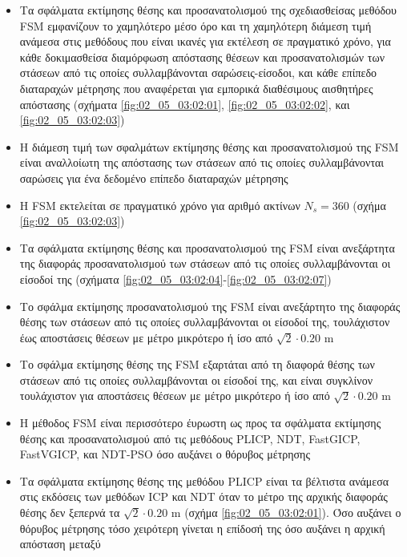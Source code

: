\begin{itemize}
  \item Τα σφάλματα εκτίμησης θέσης και προσανατολισμού της σχεδιασθείσας
        μεθόδου FSM εμφανίζουν το χαμηλότερο μέσο όρο και τη χαμηλότερη
        διάμεση τιμή ανάμεσα στις μεθόδους που είναι ικανές για εκτέλεση σε
        πραγματικό χρόνο, για κάθε δοκιμασθείσα διαμόρφωση απόστασης θέσεων και
        προσανατολισμών των στάσεων από τις οποίες συλλαμβάνονται
        σαρώσεις-είσοδοι, και κάθε επίπεδο διαταραχών μέτρησης που αναφέρεται
        για εμπορικά διαθέσιμους αισθητήρες απόστασης (σχήματα
        \ref{fig:02_05_03:02:01}, \ref{fig:02_05_03:02:02}, και
        \ref{fig:02_05_03:02:03})
  \item Η διάμεση τιμή των σφαλμάτων εκτίμησης θέσης και προσανατολισμού
        της FSM είναι αναλλοίωτη της απόστασης των στάσεων από τις οποίες
        συλλαμβάνονται σαρώσεις για ένα δεδομένο επίπεδο διαταραχών μέτρησης
  \item Η FSM εκτελείται σε πραγματικό χρόνο για αριθμό ακτίνων $N_s = 360$
        (σχήμα \ref{fig:02_05_03:02:03})
  \item Τα σφάλματα εκτίμησης θέσης και προσανατολισμού της FSM είναι
        ανεξάρτητα της διαφοράς προσανατολισμού των στάσεων από τις οποίες
        συλλαμβάνονται οι είσοδοί της (σχήματα
        \ref{fig:02_05_03:02:04}-\ref{fig:02_05_03:02:07})
  \item Το σφάλμα εκτίμησης προσανατολισμού της FSM είναι ανεξάρτητο της
        διαφοράς θέσης των στάσεων από τις οποίες συλλαμβάνονται οι είσοδοί της,
        τουλάχιστον έως αποστάσεις θέσεων με μέτρο μικρότερο ή ίσο από
        $\sqrt{2}\cdot 0.20$ m
  \item Το σφάλμα εκτίμησης θέσης της FSM εξαρτάται από τη διαφορά θέσης των
        στάσεων από τις οποίες συλλαμβάνονται οι είσοδοί της, και είναι
        συγκλίνον τουλάχιστον για αποστάσεις θέσεων με μέτρο μικρότερο ή ίσο από
        $\sqrt{2}\cdot 0.20$ m
  \item Η μέθοδος FSM είναι περισσότερο έυρωστη ως προς τα σφάλματα εκτίμησης
        θέσης και προσανατολισμού από τις μεθόδους PLICP, NDT, FastGICP,
        FastVGICP, και NDT-PSO όσο αυξάνει ο θόρυβος μέτρησης
  \item Τα σφάλματα εκτίμησης θέσης της μεθόδου PLICP είναι τα βέλτιστα ανάμεσα
        στις εκδόσεις των μεθόδων ICP και NDT όταν το μέτρο της αρχικής
        διαφοράς θέσης δεν ξεπερνά τα $\sqrt{2}\cdot 0.20$ m (σχήμα
        \ref{fig:02_05_03:02:01}). Όσο αυξάνει ο θόρυβος μέτρησης τόσο
        χειρότερη γίνεται η επίδοσή της όσο αυξάνει η αρχική απόσταση μεταξύ

\end{itemize}
